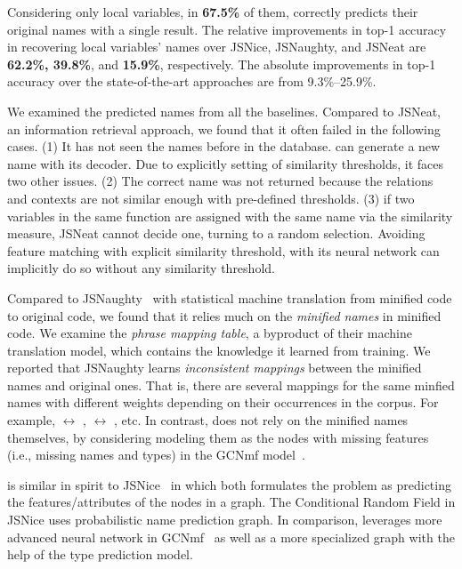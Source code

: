 Considering only local variables, in {\bf 67.5\%} of them, {\tool}
correctly predicts their original names with a single result. The
relative improvements in top-1 accuracy in recovering local variables'
names over JSNice, JSNaughty, and JSNeat are {\bf 62.2\%, 39.8\%}, and
{\bf 15.9\%}, respectively. The absolute improvements in top-1
accuracy over the state-of-the-art approaches are from 9.3\%--25.9\%.

We examined the predicted names from all the baselines. Compared to
JSNeat, an information retrieval approach, we found that it often
failed in the following cases. (1) It has not seen the names before in
the database. {\tool} can generate a new name with its decoder. Due to
explicitly setting of similarity thresholds, it faces two other
issues. (2) The correct name was not returned because the relations
and contexts are not similar enough with pre-defined thresholds.  (3)
if two variables in the same function are assigned with the same name
via the similarity measure, JSNeat cannot decide one, turning to a
random selection. Avoiding feature matching with explicit similarity
threshold, {\tool} with its neural network can implicitly do so
without any similarity threshold.

Compared to JSNaughty~\cite{JSNaughty2017} with statistical machine
translation from minified code to original code, we found that it
relies much on the {\em minified names} in minified code. We examine
the {\em phrase mapping table}, a byproduct of their machine
translation model, which contains the knowledge it learned from
training. We reported that JSNaughty learns {\em inconsistent
  mappings} between the minified names and original ones. That is,
there are several mappings for the same minfied names with different
weights depending on their occurrences in the corpus. For example,
 $\leftrightarrow$ ,  $\leftrightarrow$
, etc. In contrast, {\tool} does not rely on the minified
names themselves, by considering modeling them as the nodes with
missing features (i.e., missing names and types) in the GCNmf
model~\cite{GCNmf}.

{\tool} is similar in spirit to JSNice~\cite{JSNice2015} in which both
formulates the problem as predicting the features/attributes of the
nodes in a graph. The Conditional Random Field in JSNice uses
probabilistic name prediction graph. In comparison, {\tool} leverages
more advanced neural network in GCNmf~\cite{GCNmf} as well as a more
specialized graph with the help of the type prediction model.

